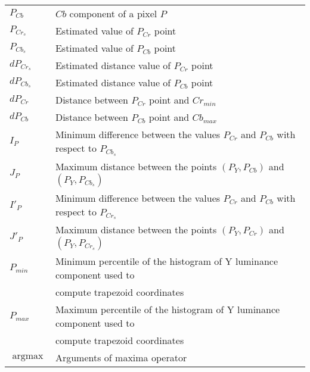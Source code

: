 \documentclass[11pt,twoside,a4paper]{book}
\theoremstyle{plain}
\theoremstyle{definition}
\DeclareMathOperator*{\argmax}{argmax}
\begin{document}
\begin{tabular}{ll}
    $P_{Cb}$    & $Cb$ component of a pixel $P$ \\
    $P_{Cr_{s}}$& Estimated value of $P_{Cr}$ point \\
    $P_{Cb_{s}}$& Estimated value of $P_{Cb}$ point \\
    $dP_{Cr_{s}}$& Estimated distance value of $P_{Cr}$ point \\
    $dP_{Cb_{s}}$& Estimated distance value of $P_{Cb}$ point \\
    $dP_{Cr}$   & Distance between $P_{Cr}$ point and $Cr_{min}$ \\
    $dP_{Cb}$   & Distance between $P_{Cb}$ point and $Cb_{max}$ \\
    $I_P$       & Minimum difference between the values $P_{Cr}$ and $P_{Cb}$ with respect to $P_{Cb_s}$ \\
    $J_P$       & Maximum distance between the points $(P_Y, P_{Cb})$ and $(P_Y, P_{Cb_s})$ \\
    $I'_P$      & Minimum difference between the values $P_{Cr}$ and $P_{Cb}$ with respect to $P_{Cr_s}$ \\
    $J'_P$      & Maximum distance between the points $(P_Y, P_{Cr})$ and $(P_Y, P_{Cr_s})$ \\
    $P_{min}$   & Minimum percentile of the histogram of Y luminance component used to \\
                & compute trapezoid coordinates \\
    $P_{max}$   & Maximum percentile of the histogram of Y luminance component used to \\
                & compute trapezoid coordinates \\
    $\argmax$   & Arguments of maxima operator \\
\end{tabular}

\listoffigures            
\listoftables            

\mainmatter

\fancyhead[RE,LO]{\thesection}

\singlespacing              %







\end{document}

